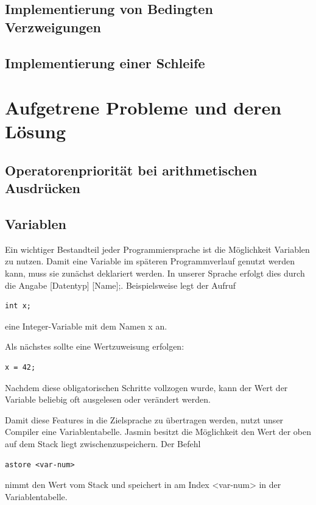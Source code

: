 \documentclass[12pt, a4paper, oneside, ngerman]{article}
\begin{document}
\subsection{Implementierung von Bedingten Verzweigungen}

\subsection{Implementierung einer Schleife}




\pagebreak
\section{Aufgetrene Probleme und deren Lösung}

\subsection{Operatorenpriorität bei arithmetischen Ausdrücken}

\subsection{Variablen}
Ein wichtiger Bestandteil jeder Programmiersprache ist die Möglichkeit Variablen zu nutzen. Damit eine Variable im späteren Programmverlauf genutzt werden kann, muss sie zunächst deklariert werden. In unserer Sprache erfolgt dies durch die Angabe [Datentyp] [Name];. Beispielsweise legt der Aufruf

\begin{lstlisting}[frame=single]
int x;
\end{lstlisting}

eine Integer-Variable mit dem Namen x an.

Als nächstes sollte eine Wertzuweisung erfolgen:
\begin{lstlisting}[frame=single]
x = 42;
\end{lstlisting}

Nachdem diese obligatorischen Schritte vollzogen wurde, kann der Wert der Variable beliebig oft ausgelesen oder verändert werden.

Damit diese Features in die Zielsprache zu übertragen werden, nutzt unser Compiler eine Variablentabelle. Jasmin besitzt die Möglichkeit den Wert der oben auf dem Stack liegt zwischenzuspeichern. Der Befehl
\begin{lstlisting}[frame=single]
astore <var-num>
\end{lstlisting}
nimmt den Wert vom Stack und speichert in am Index <var-num> in der Variablentabelle.
\end{document}
